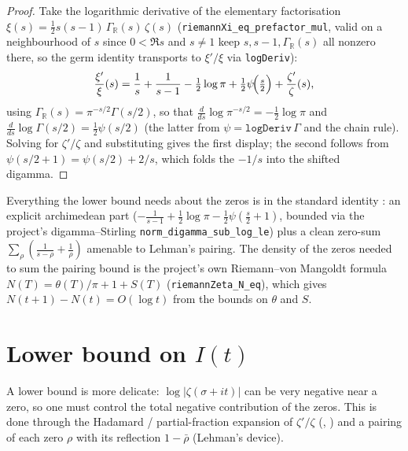 \begin{proof}
\leanok
{}
Take the logarithmic derivative of the elementary factorisation
$\xi(s)=\tfrac12 s(s-1)\,\Gamma_{\mathbb R}(s)\,\zeta(s)$
(\texttt{riemannXi\_eq\_prefactor\_mul}, valid on a neighbourhood of $s$ since
$0<\Re s$ and $s\neq1$ keep $s,s-1,\Gamma_{\mathbb R}(s)$ all nonzero there, so the
germ identity transports to $\xi'/\xi$ via \texttt{logDeriv}):
\[
  \frac{\xi'}{\xi}(s)=\frac1s+\frac1{s-1}-\tfrac12\log\pi+\tfrac12\psi\!\Bigl(\tfrac s2\Bigr)
    +\frac{\zeta'}{\zeta}(s),
\]
using $\Gamma_{\mathbb R}(s)=\pi^{-s/2}\Gamma(s/2)$, so that
$\tfrac{d}{ds}\log\pi^{-s/2}=-\tfrac12\log\pi$ and
$\tfrac{d}{ds}\log\Gamma(s/2)=\tfrac12\psi(s/2)$ (the latter from
$\psi=\texttt{logDeriv}\,\Gamma$ and the chain rule). Solving for $\zeta'/\zeta$ and
substituting  gives the first display; the second follows from
$\psi(s/2+1)=\psi(s/2)+2/s$, which folds the $-1/s$ into the shifted digamma.
\end{proof}

\begin{remark}
Everything the lower bound needs about the zeros is in the standard identity
: an explicit archimedean part
($-\tfrac1{s-1}+\tfrac12\log\pi-\tfrac12\psi(\tfrac s2+1)$, bounded via the
project's digamma--Stirling \texttt{norm\_digamma\_sub\_log\_le}) plus a clean
zero-sum $\sum_\rho(\tfrac1{s-\rho}+\tfrac1\rho)$ amenable to Lehman's pairing. The
density of the zeros needed to sum the pairing bound is the project's own
Riemann--von Mangoldt formula $N(T)=\theta(T)/\pi+1+S(T)$
(\texttt{riemannZeta\_N\_eq}), which gives $N(t+1)-N(t)=O(\log t)$ from the bounds
on $\theta$ and $S$.
\end{remark}

\section{Lower bound on \texorpdfstring{$I(t)$}{I(t)}}
\label{sec:lb_lower}

A lower bound is more delicate: $\log|\zeta(\sigma+it)|$ can be very negative near
a zero, so one must control the total negative contribution of the zeros. This is
done through the Hadamard / partial-fraction expansion of $\zeta'/\zeta$
(, ) and a pairing of each zero $\rho$ with
its reflection $1-\bar\rho$ (Lehman's device).

